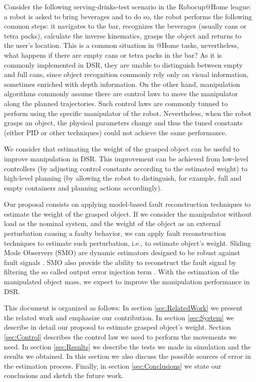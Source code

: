 \documentclass[conference,letterpaper]{ieeeconf}
\begin{document}
Consider the following serving-drinks-test scenario in the Robocup@Home league: a robot is asked to bring beverages and to do so, the robot performs the following common steps: it navigates to the bar, recognizes the beverages (usually cans or tetra packs), calculate the inverse kinematics, grasps the object and returns to the user's location. This is a common situation in @Home tasks, nevertheless, what happens if there are empty cans or tetra packs in the bar? As it is commonly implemented in DSR, they are unable to distinguish between empty and full cans, since object recognition commonly rely only on visual information, sometimes enriched with depth information. On the other hand, manipulation algorithms commonly assume there are control laws to move the manipulator along the planned trajectories. Such control laws are commonly tunned to perform using the specific manipulator of the robot. Nevertheless, when the robot grasps an object, the physical parameters change and thus the tuned constants (either PID or other techniques) could not achieve the same performance.

We consider that estimating the weight of the grasped object can be useful to improve manipulation in DSR. This improvement can be achieved from low-level controllers (by adjusting control constants according to the estimated weight) to high-level planning (by allowing the robot to distinguish, for example, full and empty containers and planning actions accordingly). 

Our proposal consists on applying model-based fault reconstruction techniques \cite{ding2013model} to estimate the weight of the grasped object. If we consider the manipulator without load  as the nominal system, and the weight of the object as an external perturbation causing a faulty behavior, we can apply fault reconstruction techniques to estimate such perturbation, i.e., to estimate object's weight. Sliding Mode Observers (SMO) are dynamic estimators designed to be robust against fault signals \cite{shtessel2014sliding}. SMO also provide the ability to reconstruct the fault signal by filtering the so called output error injection term \cite{alwi2011fault}. With the estimation of the manipulated object mass, we expect to improve the manipulation performance in DSR. 

This document is organized as follows: In section \ref{sec:RelatedWork} we present the related work and emphasize our contribution. In section \ref{sec:System} we describe in detail our proposal to estimate grasped object's weight. Section \ref{sec:Control} describes the control law we used to perform the movements we need. In section \ref{sec:Results} we describe the tests we made in simulation and the results we obtained. In this section we also discuss the possible sources of error in the estimation process. Finally, in section \ref{sec:Conclusions} we state our conclusions and sketch the future work.
\end{document}
